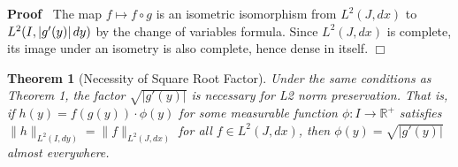 \documentclass{article}
\newenvironment{proof}{\noindent\textbf{Proof\ }}{\hspace*{\fill}$\Box$\medskip}
\newtheorem{theorem}{Theorem}
\begin{document}
\begin{proof}
  The map $f \mapsto f \circ g$ is an isometric isomorphism from $L^2 (J, dx)$
  to $L^2 (I, |g' (y) | \hspace{0.17em} dy)$ by the change of variables
  formula. Since $L^2 (J, dx)$ is complete, its image under an isometry is
  also complete, hence dense in itself.
\end{proof}

\begin{theorem}
  [Necessity of Square Root Factor] Under the same conditions as Theorem 1,
  the factor $\sqrt{|g' (y) |}$ is necessary for L2 norm preservation. That
  is, if $h (y) = f (g (y)) \cdot \phi (y)$ for some measurable function $\phi
  : I \to \mathbb{R}^+$ satisfies $\|h\|_{L^2 (I, dy)} = \|f\|_{L^2 (J, dx)}$
  for all $f \in L^2 (J, dx)$, then $\phi (y) = \sqrt{|g' (y) |}$ almost
  everywhere.
\end{theorem}
\end{document}
